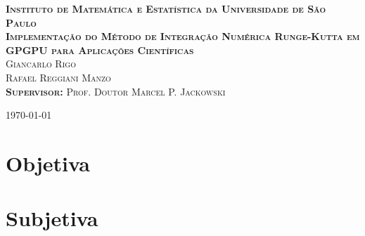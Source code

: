 \documentclass[brazil,a4paper,11pt]{book}
\begin{document}
\begin{titlepage}
  \begin{center}
  \textsc{{\small \textbf{Instituto de Matemática e Estatística da Universidade de São Paulo}}}
  \\[6cm]
  \textsc{{\large \textbf{Implementação do Método de Integração Numérica Runge-Kutta em GPGPU para Aplicações Científicas}}}
  \\[2cm]
  \textsc{Giancarlo Rigo\\
          Rafael Reggiani Manzo\\
          \textbf{Supervisor:} Prof. Doutor Marcel P. Jackowski}
  
  \vfill
  \today
  \end{center}
\end{titlepage}

\tableofcontents

\part{Objetiva}







\part{Subjetiva}
\end{document}
